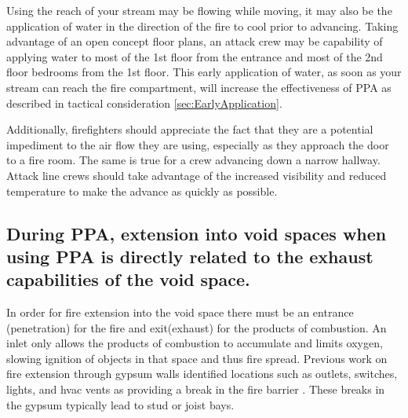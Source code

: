 \documentclass{article}
\begin{document}
Using the reach of your stream may be flowing while moving, it may also be the application of water in the direction of the fire to cool prior to advancing. Taking advantage of an open concept floor plans, an attack crew may be capability of applying water to most of the 1st floor from the entrance and most of the 2nd floor bedrooms from the 1st floor.  This early application of water, as soon as your stream can reach the fire compartment, will increase the effectiveness of PPA as described in tactical consideration \ref{sec:EarlyApplication}.

Additionally, firefighters should appreciate the fact that they are a potential impediment to the air flow they are using, especially as they approach the door to a fire room. The same is true for a crew advancing down a narrow hallway. Attack line crews should take advantage of the increased visibility and reduced temperature to make the advance as quickly as possible.

\subsection{During PPA, extension into void spaces when using PPA is directly related to the exhaust capabilities of the void space.} \label{TC:Extension_Into_Voids}
In order for fire extension into the void space there must be an entrance (penetration) for the fire and exit(exhaust) for the products of combustion. An inlet only allows the products of combustion to accumulate and limits oxygen, slowing ignition of objects in that space and thus fire spread. Previous work on fire extension through gypsum walls identified locations such as outlets, switches, lights, and hvac vents as providing a break in the fire barrier\cite{DHS2011} \cite{WeinschenkStrongVentFlowFires}.  These breaks in the gypsum typically lead to stud or joist bays. 
\end{document}
